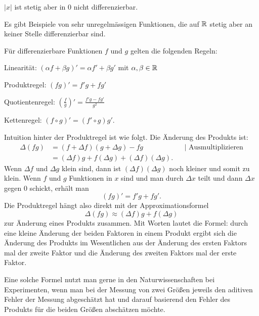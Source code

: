 \begin{bsp} 
	$|x|$ ist stetig aber in $0$ nicht differenzierbar. 
\end{bsp} 

\begin{bem}
	Es gibt Beispiele von sehr unregelmässigen Funktionen, die auf $\mathbb{R}$ stetig aber an keiner Stelle differenzierbar sind. 
\end{bem} 

\begin{thm}
	Für differenzierbare Funktionen $f$ und $g$ gelten die folgenden Regeln: 
	\begin{enuma}
		\item Linearität: $(\alpha f + \beta g)'= \alpha f' + \beta g'$ mit $\alpha, \beta \in \mathbb{R}$
		\item Produktregel: $(f g)' = f' g + f g'$
		\item Quotientenregel: $\left( \frac{f}{g} \right)' = \frac{f' g  - f g'}{g^2}$
		\item Kettenregel: $(f \circ g)' = (f' \circ g) g'$.  
	\end{enuma}
\end{thm} 


\begin{bem}
	Intuition hinter der Produktregel ist wie folgt. Die Änderung des Produkts ist: 
	\begin{align*}
		\Delta (f g) & = (f+\Delta f) ( g + \Delta g) - f g & & |\text{ Ausmultiplizieren} 
		 \\ & = (\Delta f) g  + f (\Delta g ) + (\Delta f) (\Delta g).
	\end{align*}
	Wenn $\Delta f$ und $\Delta g$ klein sind, dann ist $(\Delta f) (\Delta g)$ noch kleiner und somit zu klein. Wenn $f$ und $g$ Funktionen in $x$ sind und man durch $\Delta x$ teilt und dann $\Delta x$ gegen $0$ schickt, erhält man 
	\[
		(f g)' = f' g + f g'.
	\]
	Die Produktregel hängt also direkt mit der Approximationsformel
	\[
		\Delta (f g) \approx(\Delta f) g + f (\Delta g)
	\]
	zur Änderung eines Produkts zusammen. Mit Worten lautet die Formel: durch eine kleine Änderung der beiden Faktoren in einem Produkt  ergibt sich die Änderung des Produkts im Wesentlichen aus der Änderung des ersten Faktors mal der zweite Faktor und die Änderung des zweiten Faktors mal der erste Faktor. 
	
	Eine solche Formel nutzt man gerne in den Naturwissenschaften bei Experimenten, wenn man bei der Messung von zwei Größen jeweils den aditiven Fehler der Messung abgeschätzt hat und darauf basierend den Fehler des Produkts für die beiden Größen abschätzen möchte. 
\end{bem} 

